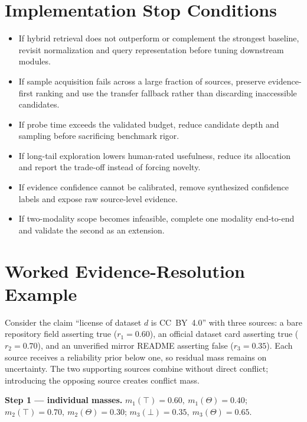 \documentclass[11pt]{article}
\begin{document}
\section{Implementation Stop Conditions}
\begin{itemize}[leftmargin=*]
\item If hybrid retrieval does not outperform or complement the strongest baseline, revisit normalization
      and query representation before tuning downstream modules.
\item If sample acquisition fails across a large fraction of sources, preserve evidence-first ranking and
      use the transfer fallback rather than discarding inaccessible candidates.
\item If probe time exceeds the validated budget, reduce candidate depth and sampling before sacrificing
      benchmark rigor.
\item If long-tail exploration lowers human-rated usefulness, reduce its allocation and report the
      trade-off instead of forcing novelty.
\item If evidence confidence cannot be calibrated, remove synthesized confidence labels and expose
      raw source-level evidence.
\item If two-modality scope becomes infeasible, complete one modality end-to-end and validate the second
      as an extension.
\end{itemize}

\section{Worked Evidence-Resolution Example}
\label{app:worked-example}
Consider the claim ``license of dataset $d$ is CC~BY~4.0'' with three sources: a bare repository field
asserting true ($r_1 = 0.60$), an official dataset card asserting true ($r_2 = 0.70$), and an unverified
mirror README asserting false ($r_3 = 0.35$). Each source receives a reliability prior below one, so
residual mass remains on uncertainty. The two supporting sources combine without direct conflict;
introducing the opposing source creates conflict mass.

\textbf{Step 1 --- individual masses.}
$m_1(\top)=0.60,\ m_1(\Theta)=0.40$; \quad
$m_2(\top)=0.70,\ m_2(\Theta)=0.30$; \quad
$m_3(\bot)=0.35,\ m_3(\Theta)=0.65$.
\end{document}
